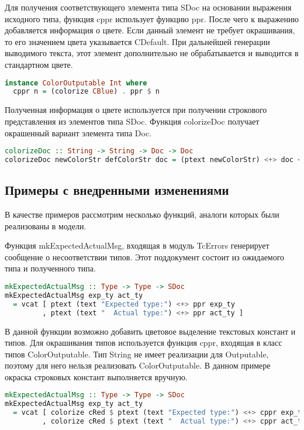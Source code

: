 Для получения соответствующего элемента типа SDoc на основании выражения исходного типа, функция cppr использует функцию ppr. После чего к выражению добавляется информация о цвете. Если данный элемент не требует окрашивания, то его значением цвета указывается CDefault. При дальнейшей генерации выводимого текста, этот элемент дополнительно не обрабатывается и выводится в стандартном цвете.

\begin{lstlisting}[language=Haskell, caption=Пример реализации ColorOutputable для типа Int]
instance ColorOutputable Int where
  cppr n = (colorize CBlue) . ppr $ n
\end{lstlisting}

Полученная информация о цвете используется при получении строкового представления из элементов типа SDoc. Функция colorizeDoc получает окрашенный вариант элемента типа Doc.

\begin{lstlisting}[language=Haskell]
colorizeDoc :: String -> String -> Doc -> Doc
colorizeDoc newColorStr defColorStr doc = (ptext newColorStr) <+> doc <+> (ptext defColorStr)
\end{lstlisting}


\subsection{Примеры с внедренными изменениями}

В качестве примеров рассмотрим несколько функций, аналоги которых были реализованы в модели.

Функция mkExpectedActualMsg, входящая в модуль TcErrors генерирует сообщение о несоответствии типов. Этот поддокумент состоит из ожидаемого типа и полученного типа.

\begin{lstlisting}[language=Haskell]
mkExpectedActualMsg :: Type -> Type -> SDoc
mkExpectedActualMsg exp_ty act_ty
  = vcat [ ptext (text "Expected type:") <+> ppr exp_ty
         , ptext (text "  Actual type:") <+> ppr act_ty ]
\end{lstlisting}

В данной функции возможно добавить цветовое выделение текстовых констант и типов. Для окрашивания типов используется функция cppr, входящая в класс типов ColorOutputable. Тип String не имеет реализации для Outputable, поэтому для него нельзя реализовать ColorOutputable. В данном примере окраска строковых констант выполняется вручную.

\begin{lstlisting}[language=Haskell, caption=Реализация функции с изменениями]
mkExpectedActualMsg :: Type -> Type -> SDoc
mkExpectedActualMsg exp_ty act_ty
  = vcat [ colorize cRed $ ptext (text "Expected type:") <+> cppr exp_ty
         , colorize cRed $ ptext (text "  Actual type:") <+> cppr act_ty ]
\end{lstlisting}

